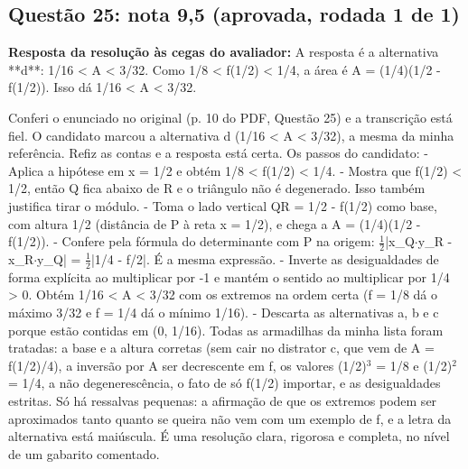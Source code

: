 \documentclass{article}%
\begin{document}
\subsection*{Questão 25: nota 9,5 (aprovada, rodada 1 de 1)}%
\textbf{Resposta da resolução às cegas do avaliador:} A resposta é a alternativa **d**: 1/16 < A < 3/32.\newline%
\newline%
Como 1/8 < f(1/2) < 1/4, a área é A = (1/4)(1/2 - f(1/2)). Isso dá 1/16 < A < 3/32.\par %
Conferi o enunciado no original (p. 10 do PDF, Questão 25) e a transcrição está fiel. O candidato marcou a alternativa d (1/16 < A < 3/32), a mesma da minha referência. Refiz as contas e a resposta está certa.\newline%
\newline%
Os passos do candidato:\newline%
{-} Aplica a hipótese em x = 1/2 e obtém 1/8 < f(1/2) < 1/4.\newline%
{-} Mostra que f(1/2) < 1/2, então Q fica abaixo de R e o triângulo não é degenerado. Isso também justifica tirar o módulo.\newline%
{-} Toma o lado vertical QR = 1/2 - f(1/2) como base, com altura 1/2 (distância de P à reta x = 1/2), e chega a A = (1/4)(1/2 - f(1/2)).\newline%
{-} Confere pela fórmula do determinante com P na origem: $\frac12$|x\_Q$\cdot$y\_R - x\_R$\cdot$y\_Q| = $\frac12$|1/4 - f/2|. É a mesma expressão.\newline%
{-} Inverte as desigualdades de forma explícita ao multiplicar por -1 e mantém o sentido ao multiplicar por 1/4 > 0. Obtém 1/16 < A < 3/32 com os extremos na ordem certa (f = 1/8 dá o máximo 3/32 e f = 1/4 dá o mínimo 1/16).\newline%
{-} Descarta as alternativas a, b e c porque estão contidas em (0, 1/16).\newline%
\newline%
Todas as armadilhas da minha lista foram tratadas: a base e a altura corretas (sem cair no distrator c, que vem de A = f(1/2)/4), a inversão por A ser decrescente em f, os valores (1/2)$^3$ = 1/8 e (1/2)$^2$ = 1/4, a não degenerescência, o fato de só f(1/2) importar, e as desigualdades estritas.\newline%
\newline%
Só há ressalvas pequenas: a afirmação de que os extremos podem ser aproximados tanto quanto se queira não vem com um exemplo de f, e a letra da alternativa está maiúscula. É uma resolução clara, rigorosa e completa, no nível de um gabarito comentado.%
\end{document}
